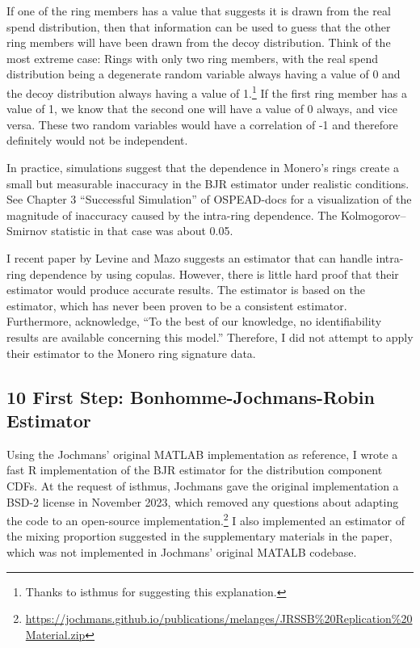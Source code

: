 \documentclass[english]{article}
\begin{document}
If one of the ring members has a value that suggests it is drawn from
the real spend distribution, then that information can be used to
guess that the other ring members will have been drawn from the decoy
distribution. Think of the most extreme case: Rings with only two
ring members, with the real spend distribution being a degenerate
random variable always having a value of 0 and the decoy distribution
always having a value of 1.\footnote{Thanks to isthmus for suggesting this explanation.}
If the first ring member has a value of 1, we know that the second
one will have a value of 0 always, and vice versa. These two random
variables would have a correlation of -1 and therefore definitely
would not be independent.

In practice, simulations suggest that the dependence in Monero's rings
create a small but measurable inaccuracy in the BJR estimator under
realistic conditions. See Chapter 3 ``Successful Simulation'' of
OSPEAD-docs for a visualization of the magnitude of inaccuracy caused
by the intra-ring dependence. The Kolmogorov--Smirnov statistic in
that case was about 0.05.

I recent paper by Levine and Mazo suggests an estimator that can handle
intra-ring dependence by using copulas\cite{Levine_2024}. However,
there is little hard proof that their estimator would produce accurate
results. The \cite{Levine_2024} estimator is based on the \cite{Levine2011}
estimator, which has never been proven to be a consistent estimator.
Furthermore, \cite{Levine_2024} acknowledge, ``To the best of our
knowledge, no identifiability results are available concerning this
model.'' Therefore, I did not attempt to apply their estimator to
the Monero ring signature data.

\subsection*{10 First Step: Bonhomme-Jochmans-Robin Estimator}

Using the Jochmans' original MATLAB implementation as reference, I
wrote a fast R implementation of the BJR estimator for the distribution
component CDFs. At the request of isthmus, Jochmans gave the original
implementation a BSD-2 license in November 2023, which removed any
questions about adapting the code to an open-source implementation.\footnote{\href{https://jochmans.github.io/publications/melanges/JRSSB\%20Replication\%20Material.zip}{https://jochmans.github.io/publications/melanges/JRSSB\%20Replication\%20Material.zip}}
I also implemented an estimator of the mixing proportion suggested
in the supplementary materials in the paper, which was not implemented
in Jochmans' original MATALB codebase.
\end{document}
